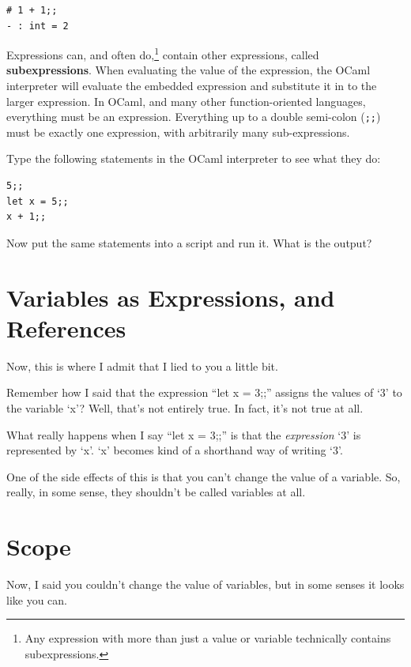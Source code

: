 \documentclass[10pt]{book}
\begin{document}
\beforeverb
\begin{verbatim}
# 1 + 1;;
- : int = 2
\end{verbatim}
\afterverb

Expressions can, and often do,\footnote{Any expression with more than just a value or 
variable technically contains subexpressions.} contain other expressions, called {\bf 
subexpressions}. When evaluating the value of the expression, the OCaml interpreter 
will evaluate the embedded expression and substitute it in to the larger expression. 
In OCaml, and many other function-oriented languages, everything must be an expression. 
Everything up to a double semi-colon ({\tt ;;}) must be exactly one expression, with 
arbitrarily many sub-expressions.

\begin{ex}
Type the following statements in the OCaml interpreter to see
what they do:

\beforeverb
\begin{verbatim}
5;;
let x = 5;;
x + 1;;
\end{verbatim}
\afterverb
%
Now put the same statements into a script and run it.  What
is the output?
\end{ex}

\section{Variables as Expressions, and References}


Now, this is where I admit that I lied to you a little bit.

Remember how I said that the expression ``let x = 3;;'' assigns
the values of `3' to the variable `x'? Well, that's not
entirely true. In fact, it's not true at all.

What really happens when I say ``let x = 3;;'' is that the {\it expression}
`3' is represented by `x'. `x' becomes kind of a shorthand way of writing `3'.

One of the side effects of this is that you can't change the value of a variable.
So, really, in some sense, they shouldn't be called variables at all.

\section{Scope}

Now, I said you couldn't change the value of variables, but in some senses it looks like you can.
\end{document}
